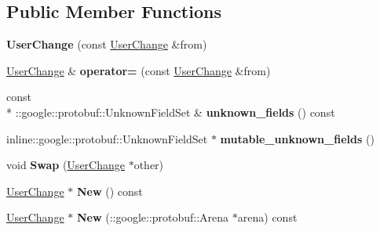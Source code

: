 \subsection*{Public Member Functions}
\begin{DoxyCompactItemize}
\item 
\hypertarget{classSimpleChat_1_1UserChange_a98ca1ff874642317f5f0ac5e1ae2dc30}{{\bfseries User\-Change} (const \hyperlink{classSimpleChat_1_1UserChange}{User\-Change} \&from)}\label{classSimpleChat_1_1UserChange_a98ca1ff874642317f5f0ac5e1ae2dc30}

\item 
\hypertarget{classSimpleChat_1_1UserChange_ad391b41999e61260da05e2d8b3c8635f}{\hyperlink{classSimpleChat_1_1UserChange}{User\-Change} \& {\bfseries operator=} (const \hyperlink{classSimpleChat_1_1UserChange}{User\-Change} \&from)}\label{classSimpleChat_1_1UserChange_ad391b41999e61260da05e2d8b3c8635f}

\item 
\hypertarget{classSimpleChat_1_1UserChange_ab1379a1c02c0fc0c33c8ffc8c070ed7f}{const \\*
\-::google\-::protobuf\-::\-Unknown\-Field\-Set \& {\bfseries unknown\-\_\-fields} () const }\label{classSimpleChat_1_1UserChange_ab1379a1c02c0fc0c33c8ffc8c070ed7f}

\item 
\hypertarget{classSimpleChat_1_1UserChange_a41d734c4dd617a385ff6d3fcd09247a7}{inline\-::google\-::protobuf\-::\-Unknown\-Field\-Set $\ast$ {\bfseries mutable\-\_\-unknown\-\_\-fields} ()}\label{classSimpleChat_1_1UserChange_a41d734c4dd617a385ff6d3fcd09247a7}

\item 
\hypertarget{classSimpleChat_1_1UserChange_a62ba7a58186d3bbb6b643b8e7409173e}{void {\bfseries Swap} (\hyperlink{classSimpleChat_1_1UserChange}{User\-Change} $\ast$other)}\label{classSimpleChat_1_1UserChange_a62ba7a58186d3bbb6b643b8e7409173e}

\item 
\hypertarget{classSimpleChat_1_1UserChange_a002b6ac71b6aca760862cca40d43fb7b}{\hyperlink{classSimpleChat_1_1UserChange}{User\-Change} $\ast$ {\bfseries New} () const }\label{classSimpleChat_1_1UserChange_a002b6ac71b6aca760862cca40d43fb7b}

\item 
\hypertarget{classSimpleChat_1_1UserChange_a03db0c329841a894c19fa81d06af1986}{\hyperlink{classSimpleChat_1_1UserChange}{User\-Change} $\ast$ {\bfseries New} (\-::google\-::protobuf\-::\-Arena $\ast$arena) const }\label{classSimpleChat_1_1UserChange_a03db0c329841a894c19fa81d06af1986}


\end{DoxyCompactItemize}
